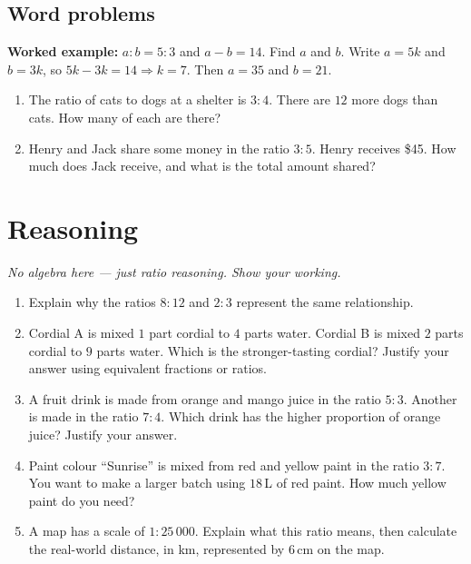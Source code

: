\documentclass[11pt]{article}
\newcommand{\ans}{\hrulefill}
\newcommand{\anshere}{\par\vspace{0.9em}\noindent\ans\par\vspace{1.3em}}
\begin{document}
\begin{multicols}{2}
\subsection*{Word problems}
\noindent\textbf{Worked example:} $a:b=5:3$ and $a-b=14$. Find $a$ and $b$. Write
$a=5k$ and $b=3k$, so $5k-3k=14 \Rightarrow k=7$. Then $a=35$ and $b=21$.
\vspace{0.2em}
\begin{enumerate}[label=(\alph*)]
  \item The ratio of cats to dogs at a shelter is $3:4$. There are $12$ more dogs
    than cats. How many of each are there?
  \anshere
  \item Henry and Jack share some money in the ratio $3:5$. Henry receives \$45.
    How much does Jack receive, and what is the total amount shared?
  \anshere
\end{enumerate}
\end{multicols}

\newpage

\section*{Reasoning}
\noindent\textit{No algebra here --- just ratio reasoning. Show your working.}

\renewcommand{\anshere}{\par\vspace{2.4em}\noindent\ans\par\vspace{3.2em}}

\begin{enumerate}[label=(\alph*)]
  \item Explain why the ratios $8:12$ and $2:3$ represent the same relationship.
  \anshere
  \item Cordial A is mixed $1$ part cordial to $4$ parts water. Cordial B is mixed
    $2$ parts cordial to $9$ parts water. Which is the stronger-tasting cordial?
    Justify your answer using equivalent fractions or ratios.
  \anshere
  \item A fruit drink is made from orange and mango juice in the ratio $5:3$.
    Another is made in the ratio $7:4$. Which drink has the higher proportion of
    orange juice? Justify your answer.
  \anshere
  \item Paint colour ``Sunrise'' is mixed from red and yellow paint in the ratio
    $3:7$. You want to make a larger batch using $18$\,L of red paint. How much
    yellow paint do you need?
  \anshere
  \item A map has a scale of $1:25\,000$. Explain what this ratio means, then
    calculate the real-world distance, in km, represented by $6$\,cm on the map.
  \anshere
\end{enumerate}
\end{document}
